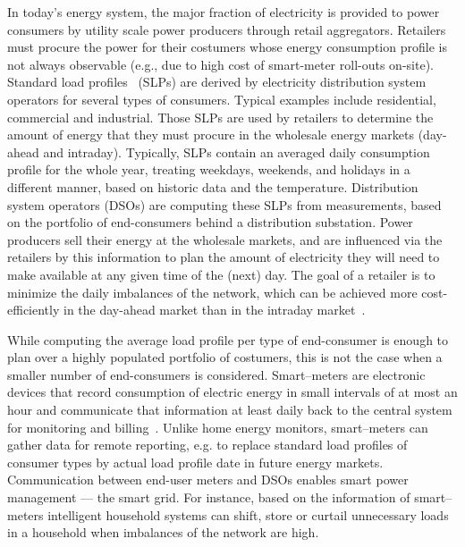 \documentclass[conference]{IEEEtran}
\begin{document}
In today's energy system, the major fraction of electricity is provided to power consumers by utility scale power producers through retail aggregators.
Retailers must procure the power for their costumers whose energy consumption profile is not always observable (e.g., due to high cost of smart-meter roll-outs on-site). Standard load profiles~\cite{jardini2000daily} (SLPs) are derived by electricity distribution system operators for several types of consumers. Typical examples include residential, commercial and industrial. Those SLPs are used by retailers to determine the amount of energy that they must procure in the wholesale energy markets (day-ahead and intraday). Typically, SLPs contain an averaged daily consumption profile for the whole year, treating weekdays, weekends, and holidays in a different manner, based on historic data and the temperature. Distribution system operators (DSOs) are computing these SLPs from measurements, based on the portfolio of end-consumers behind a distribution substation. Power producers sell their energy at the wholesale markets, and are influenced via the retailers by this information to plan the amount of electricity they will need to make available at any given time of the (next) day. The goal of a retailer is to minimize the daily imbalances of the network, which can be achieved more cost-efficiently in the day-ahead market than in the intraday market~\cite{kirschen2003demand}. %

While computing the average load profile per type of end-consumer is enough to plan over a highly populated portfolio of costumers, this is not the case when a smaller number of end-consumers is considered. Smart--meters are electronic devices that record consumption of electric energy in small intervals of at most an hour and communicate that information at least daily back to the central system for monitoring and billing~\cite{depuru2011smart}. Unlike home energy monitors, smart--meters can gather data for remote reporting, e.g. to replace standard load profiles of consumer types by actual load profile date in future energy markets. Communication between end-user meters and DSOs enables smart power management --- the smart grid. For instance, based on the information of smart--meters intelligent household systems can shift, store or curtail unnecessary loads in a household when imbalances of the network are high.
\end{document}
